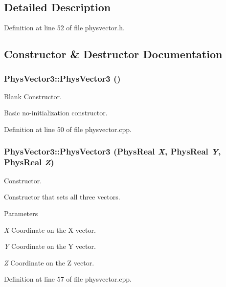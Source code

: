 \subsection{Detailed Description}


Definition at line 52 of file physvector.h.



\subsection{Constructor \& Destructor Documentation}
\hypertarget{classPhysVector3_a0d68895a6479ed7f875f666ce381afba}{
\subsubsection[{PhysVector3}]{\setlength{\rightskip}{0pt plus 5cm}PhysVector3::PhysVector3 ()}}
\label{da/d11/classPhysVector3_a0d68895a6479ed7f875f666ce381afba}


Blank Constructor. 

Basic no-\/initialization constructor. 

Definition at line 50 of file physvector.cpp.

\hypertarget{classPhysVector3_aad8161121a45b20dde0e3cc6959801be}{
\subsubsection[{PhysVector3}]{\setlength{\rightskip}{0pt plus 5cm}PhysVector3::PhysVector3 (PhysReal {\em X}, \/  PhysReal {\em Y}, \/  PhysReal {\em Z})}}
\label{da/d11/classPhysVector3_aad8161121a45b20dde0e3cc6959801be}


Constructor. 

Constructor that sets all three vectors. 
\begin{DoxyParams}{Parameters}
\item[{\em X}]Coordinate on the X vector. \item[{\em Y}]Coordinate on the Y vector. \item[{\em Z}]Coordinate on the Z vector. \end{DoxyParams}


Definition at line 57 of file physvector.cpp.



